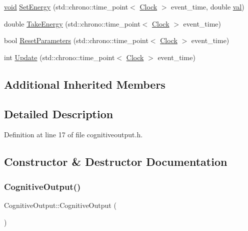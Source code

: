 \begin{DoxyCompactItemize}
\item 
\mbox{\hyperlink{glad_8h_a950fc91edb4504f62f1c577bf4727c29}{void}} \mbox{\hyperlink{class_cognitive_output_acc16ca3521689776ecd68255ece1e671}{Set\+Energy}} (std\+::chrono\+::time\+\_\+point$<$ \mbox{\hyperlink{universe_8h_a0ef8d951d1ca5ab3cfaf7ab4c7a6fd80}{Clock}} $>$ event\+\_\+time, double \mbox{\hyperlink{glad_8h_a26942fd2ed566ef553eae82d2c109c8f}{val}})
\item 
double \mbox{\hyperlink{class_cognitive_output_aae27d114676c68e02ae6e7ae36326ba8}{Take\+Energy}} (std\+::chrono\+::time\+\_\+point$<$ \mbox{\hyperlink{universe_8h_a0ef8d951d1ca5ab3cfaf7ab4c7a6fd80}{Clock}} $>$ event\+\_\+time)
\item 
bool \mbox{\hyperlink{class_cognitive_output_ab43b79aaadf75d18512c4379a77542cd}{Reset\+Parameters}} (std\+::chrono\+::time\+\_\+point$<$ \mbox{\hyperlink{universe_8h_a0ef8d951d1ca5ab3cfaf7ab4c7a6fd80}{Clock}} $>$ event\+\_\+time)
\item 
int \mbox{\hyperlink{class_cognitive_output_a2b4d33c7a529402c684d828efd25095a}{Update}} (std\+::chrono\+::time\+\_\+point$<$ \mbox{\hyperlink{universe_8h_a0ef8d951d1ca5ab3cfaf7ab4c7a6fd80}{Clock}} $>$ event\+\_\+time)
\end{DoxyCompactItemize}
\subsection*{Additional Inherited Members}


\subsection{Detailed Description}


Definition at line 17 of file cognitiveoutput.\+h.



\subsection{Constructor \& Destructor Documentation}
\mbox{\label{class_cognitive_output_a743042cff5c36a76cd975767358e1bbf}} 
\subsubsection{\texorpdfstring{Cognitive\+Output()}{CognitiveOutput()}\hspace{0.1cm}{\footnotesize\ttfamily [1/4]}}
{\footnotesize\ttfamily Cognitive\+Output\+::\+Cognitive\+Output (\begin{DoxyParamCaption}{ }\end{DoxyParamCaption})\hspace{0.3cm}{\ttfamily [inline]}}



